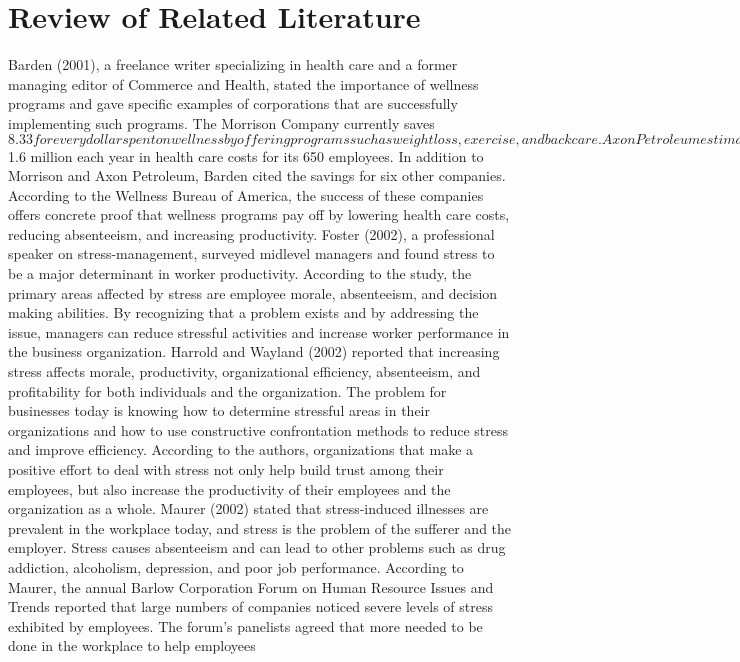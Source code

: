 \documentclass[]{article}
\begin{document}
\section{Review of Related Literature}
Barden (2001), a freelance writer specializing in health care and a former managing
editor of Commerce and Health, stated the importance of wellness programs and gave
specific examples of corporations that are successfully implementing such
programs. The Morrison Company currently saves $8.33 for every dollar spent on
wellness by offering programs such as weight loss, exercise, and back care. Axon
Petroleum estimates that wellness programs will save $1.6 million each year in health
care costs for its 650 employees. In addition to Morrison and Axon Petroleum, Barden
cited the savings for six other companies. According to the Wellness Bureau of
America, the success of these companies offers concrete proof that wellness programs
pay off by lowering health care costs, reducing absenteeism, and increasing
productivity.
Foster (2002), a professional speaker on stress-management, surveyed midlevel
managers and found stress to be a major determinant in worker productivity.
According to the study, the primary areas affected by stress are employee morale,
absenteeism, and decision making abilities. By recognizing that a problem exists and
by addressing the issue, managers can reduce stressful activities and increase worker
performance in the business organization.
Harrold and Wayland (2002) reported that increasing stress affects morale,
productivity, organizational efficiency, absenteeism, and profitability for both
individuals and the organization. The problem for businesses today is knowing how
to determine stressful areas in their organizations and how to use constructive confrontation
methods to reduce stress and improve efficiency. According to the authors,
organizations that make a positive effort to deal with stress not only help build trust
among their employees, but also increase the productivity of their employees and the
organization as a whole.
Maurer (2002) stated that stress-induced illnesses are prevalent in the
workplace today, and stress is the problem of the sufferer and the employer. Stress
causes absenteeism and can lead to other problems such as drug addiction, alcoholism,
depression, and poor job performance. According to Maurer, the annual Barlow
Corporation Forum on Human Resource Issues and Trends reported that large numbers
of companies noticed severe levels of stress exhibited by employees. The forum's
panelists agreed that more needed to be done in the workplace to help employees
\end{document}
